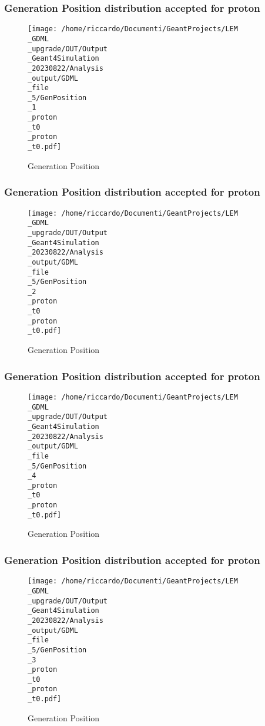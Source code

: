 \documentclass[8pt]{beamer}
\begin{document}
            \begin{frame}
                \frametitle{Generation Position distribution accepted for proton}
            
        \begin{figure}[h]
            \centering
            \texttt{[image: /home/riccardo/Documenti/GeantProjects/LEM\\\_GDML\\\_upgrade/OUT/Output\\\_Geant4Simulation\\\_20230822/Analysis\\\_output/GDML\\\_file\\\_5/GenPosition\\\_1\\\_proton\\\_t0\\\_proton\\\_t0.pdf]}
            \caption{Generation Position}
        \end{figure}
        
            \end{frame}
            
            \begin{frame}
                \frametitle{Generation Position distribution accepted for proton}
            
        \begin{figure}[h]
            \centering
            \texttt{[image: /home/riccardo/Documenti/GeantProjects/LEM\\\_GDML\\\_upgrade/OUT/Output\\\_Geant4Simulation\\\_20230822/Analysis\\\_output/GDML\\\_file\\\_5/GenPosition\\\_2\\\_proton\\\_t0\\\_proton\\\_t0.pdf]}
            \caption{Generation Position}
        \end{figure}
        
            \end{frame}
            
            \begin{frame}
                \frametitle{Generation Position distribution accepted for proton}
            
        \begin{figure}[h]
            \centering
            \texttt{[image: /home/riccardo/Documenti/GeantProjects/LEM\\\_GDML\\\_upgrade/OUT/Output\\\_Geant4Simulation\\\_20230822/Analysis\\\_output/GDML\\\_file\\\_5/GenPosition\\\_4\\\_proton\\\_t0\\\_proton\\\_t0.pdf]}
            \caption{Generation Position}
        \end{figure}
        
            \end{frame}
            
            \begin{frame}
                \frametitle{Generation Position distribution accepted for proton}
            
        \begin{figure}[h]
            \centering
            \texttt{[image: /home/riccardo/Documenti/GeantProjects/LEM\\\_GDML\\\_upgrade/OUT/Output\\\_Geant4Simulation\\\_20230822/Analysis\\\_output/GDML\\\_file\\\_5/GenPosition\\\_3\\\_proton\\\_t0\\\_proton\\\_t0.pdf]}
            \caption{Generation Position}
        \end{figure}
        
            \end{frame}
            
\end{document}
